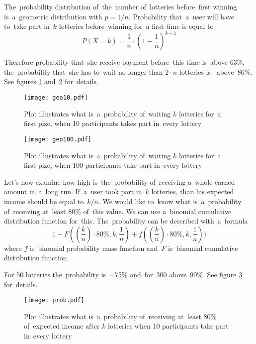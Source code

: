 \documentclass[a4paper]{article}
\begin{document}
    The~probability distribution of~the~number of~lotteries before~first winning is~a~geometric distribution with
    $p = 1/n$. Probability that~a~user will have to~take part in~$k$ lotteries before~winning for~a first time is
    equal to
    \begin{displaymath}
	    P(X = k) = \frac{1}{n} \cdot (1 - \frac{1}{n})^{k-1}
	\end{displaymath}

    Therefore probability that~she receive payment before~this time is~above 63\%, the~probability that~she has to~wait
    no longer than $2 \cdot n$ lotteries  is~ above~$86\%$. See figures \ref{fig:geo} and~\ref{fig:geo100} for~details.

    \begin{figure}
        \centering
        \texttt{[image: geo10.pdf]}
        \caption{Plot illustrates what is~a~probability of~waiting $k$ lotteries for~a first pize, when 10 participants
        takes part in~every lottery}
        \label{fig:geo}
    \end{figure}

    \begin{figure}
        \centering
        \texttt{[image: geo100.pdf]}
        \caption{Plot illustrates what is~a~probability of~waiting $k$ lotteries for~a first pize, when
        100 participants take part in~every lottery}
        \label{fig:geo100}
    \end{figure}

    Let's now examine how high is~the~probability of~receiving a~whole earned amount in~a~long run. If~a~user took part
    in~$k$ lotteries, than his expected income should be equal to~$k/n$. We would like to~know what is~a~probability
    of~receiving at~least  80\% of~this value. We can use a~binomial cumulative distribution function for~this.
    The~probability can be described with~a~formula
    \begin{displaymath}
        1 - F((\frac{k}{n})\cdot 80\%, k, \frac{1}{n}) + f((\frac{k}{n})\cdot 80\%, k, \frac{1}{n}))
    \end{displaymath}
    where $f$ is~binomial probability mass function and~$F$ is~binomial cumulative distribution function.

    For 50 lotteries the~probability is~$\sim$75\%  and~for~300 above~$90\%$. See figure \ref{fig:prob} for~details.


    \begin{figure}
        \centering
        \texttt{[image: prob.pdf]}
        \caption{Plot illustrates what is~a~probability of~receiving at~least 80\% of~expected income after $k$
        lotteries when 10 participants take part in~every lottery}
        \label{fig:prob}
    \end{figure}
\end{document}
